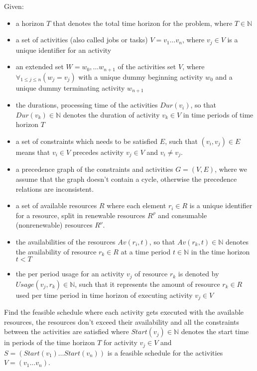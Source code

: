 \documentclass{article}
\newcommand{\renres}[0]{R^\rho} %
\newcommand{\conres}[0]{R^\nu} %
\newcommand{\av}[1]{\textit{Av}(#1)} %
\newcommand{\dur}[1]{\textit{Dur}(#1)} %
\newcommand{\usage}[1]{\textit{Usage}(#1)} %
\newcommand{\start}[1]{\textit{Start}(#1)} %
\begin{document}
Given:
\begin{itemize}
\item a horizon $T$ that denotes the total time horizon for the problem, where $T \in \mathbb{N}$
\item a set of activities (also called jobs or tasks) $V = v_1 \ldots v_n$, where $v_j \in V$ is a unique identifier for an activity
\item an extended set $W = w_0, \ldots w_{n+1}$ of the activities set $V$, where $\forall_{1 \leq j \leq n} (w_j = v_j)$ with a unique dummy beginning activity $w_0$ and a unique dummy terminating activity $w_{n+1}$
\item the durations, processing time of the activities $\dur{v_i}$, so that $\dur{v_k} \in \mathbb{N}$ denotes the duration of activity $v_k \in V$ in time periods of time horizon $T$
\item a set of constraints which needs to be satisfied $E$, such that $(v_i,v_j) \in E$ means that $v_i \in V$ precedes activity $v_j \in V$ and $v_i \neq v_j$.
\item a precedence graph of the constraints and activities $G = (V, E)$, where we assume that the graph doesn't contain a cycle, otherwise the precedence relations are inconsistent.
\item a set of available resources $R$ where each element $r_i \in R$ is a unique identifier for a resource, split in renewable resources $\renres$ and  consumable (nonrenewable) resources $\conres$.
\item the availabilities of the resources $\av{r_i, t}$, so that $\av{r_k, t} \in \mathbb{N}$ denotes the availability of resource $r_k \in R$ at a time period $t \in \mathbb{N}$ in the time horizon $t < T$
\item the per period usage for an activity $v_j$ of resource $r_k$ is denoted by $\usage{v_j, r_k} \in \mathbb{N}$, such that it represents the amount of resource $r_k \in R$ used per time period in time horizon of executing activity $v_j \in V$
\end{itemize}

Find the feasible schedule where each activity gets executed with the available resources, the resources don't exceed their availability and all the constraints between the activities are satisfied where $\start{v_j} \in \mathbb{N}$ denotes the start time in periods of the time horizon $T$ for activity $v_j \in V$ and
$S = (\start{v_1} \ldots \start{v_n})$ is a feasible schedule for the activities $V = (v_1 \ldots v_n)$.
\end{document}
